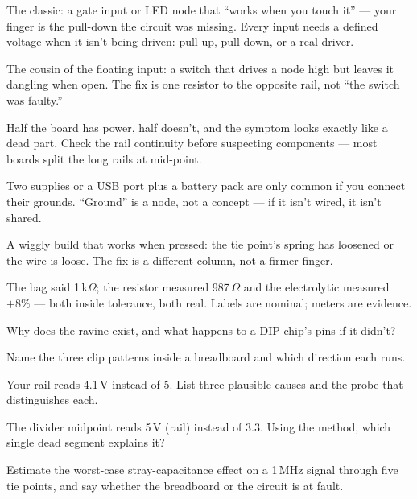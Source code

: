 \begin{tripwire}
The classic: a gate input or LED node that ``works when you touch
it'' --- your finger is the pull-down the circuit was missing. Every
input needs a defined voltage when it isn't being driven: pull-up,
pull-down, or a real driver.
\end{tripwire}
\begin{tripwire}
The cousin of the floating input: a switch that drives a node high
but leaves it dangling when open. The fix is one resistor to the
opposite rail, not ``the switch was faulty.''
\end{tripwire}
\begin{tripwire}
Half the board has power, half doesn't, and the symptom looks
exactly like a dead part. Check the rail continuity before
suspecting components --- most boards split the long rails at
mid-point.
\end{tripwire}
\begin{tripwire}
Two supplies or a USB port plus a battery pack are only common if
you connect their grounds. ``Ground'' is a node, not a concept ---
if it isn't wired, it isn't shared.
\end{tripwire}
\begin{tripwire}
A wiggly build that works when pressed: the tie point's spring has
loosened or the wire is loose. The fix is a different column, not a
firmer finger.
\end{tripwire}
\begin{tripwire}
The bag said 1\,k$\Omega$; the resistor measured 987\,$\Omega$ and
the electrolytic measured $+8\%$ --- both inside tolerance, both
real. Labels are nominal; meters are evidence.
\end{tripwire}

\begin{exercise}[easy]
Why does the ravine exist, and what happens to a DIP chip's pins
if it didn't?
\end{exercise}
\begin{exercise}[easy]
Name the three clip patterns inside a breadboard and which direction
each runs.
\end{exercise}
\begin{exercise}[medium]
Your rail reads 4.1\,V instead of 5. List three plausible causes
and the probe that distinguishes each.
\end{exercise}
\begin{exercise}[medium]
The divider midpoint reads 5\,V (rail) instead of 3.3. Using the
method, which single dead segment explains it?
\end{exercise}
\begin{exercise}[hard]
Estimate the worst-case stray-capacitance effect on a 1\,MHz signal
through five tie points, and say whether the breadboard or the
circuit is at fault.
\end{exercise}


